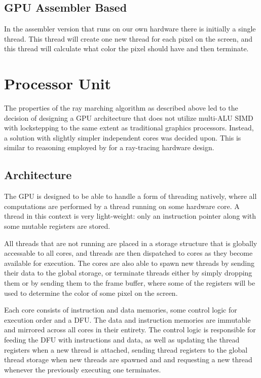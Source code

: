 		\subsection{GPU Assembler Based}

			In the assembler version that runs on our own hardware there is
			initially a single thread. This thread will create one new thread
			for each pixel on the screen, and this thread will calculate what 
			color the pixel should have and then terminate. 




	\section{Processor Unit} \label{implproc}

		The properties of the ray marching algorithm as described above led to
		the decision of designing a GPU architecture that does not utilize
		multi-ALU SIMD with lockstepping to the same extent as traditional
		graphics processors. Instead, a solution with slightly simpler
		independent cores was decided upon. This is similar to reasoning
		employed by \cite{Woop2005} for a ray-tracing hardware design.

		\subsection{Architecture}

			The GPU is designed to be able to handle a form of threading
			natively, where all computations are performed by a thread running
			on some hardware core. A thread in this context is very
			light-weight: only an instruction pointer along with some mutable
			registers are stored.

			All threads that are not running are placed in a storage structure
			that is globally accessable to all cores, and threads are then 
			dispatched to cores as they become available for execution. The 
			cores are also able to spawn new threads by sending their data to
			the global storage, or terminate threads either by simply dropping 
			them or by sending them to the frame buffer, where some of the 
			registers will be used to determine the color of some pixel on the
			screen.

			Each core consists of instruction and data memories, some control 
			logic for execution order and a DFU. The data and instruction 
			memories are immutable and mirrored across all cores in their 
			entirety. The control logic is responsible for feeding the DFU with
			instructions and data, as well as updating the thread registers 
			when a new thread is attached, sending thread registers to the 
			global thread storage when new threads are spawned and and 
			requesting a new thread whenever the previously executing one 
			terminates.
			
